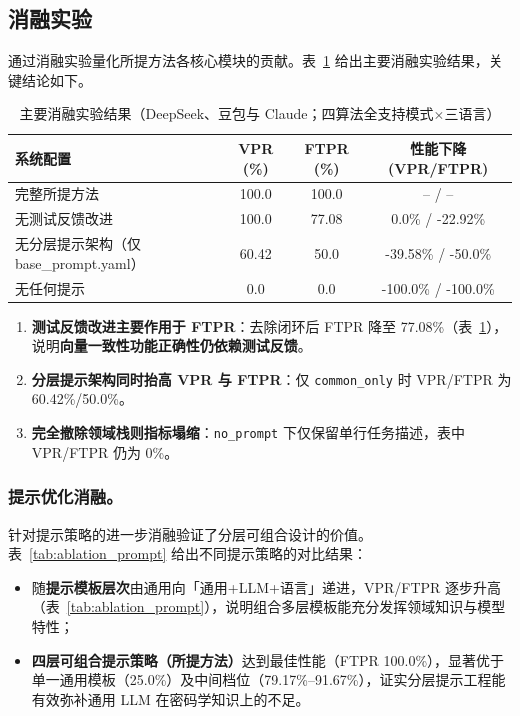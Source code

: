 \documentclass[12pt]{llncs}
\begin{document}
\subsection{消融实验}
通过消融实验量化所提方法各核心模块的贡献。表~\ref{tab:ablation_main} 给出主要消融实验结果，关键结论如下。

\begin{table}[H]
  \centering
  \footnotesize
  \caption{主要消融实验结果（DeepSeek、豆包与 Claude；四算法全支持模式$\times$三语言）}
  \label{tab:ablation_main}
  \setlength{\tabcolsep}{4pt}
  \begin{tabular}{l c c c}
    \toprule
    系统配置                  & VPR (\%) & FTPR (\%) & 性能下降 (VPR/FTPR) \\
    \midrule
    完整所提方法                  & 100.0    & 100.0     & -- / --                     \\
    无测试反馈改进         & 100.0    & 77.08     & 0.0\% / -22.92\%            \\
    无分层提示架构（仅 base_prompt.yaml）  & 60.42    & 50.0      & -39.58\% / -50.0\%          \\
    无任何提示  & 0.0    & 0.0     & -100.0\% / -100.0\%         \\
    \bottomrule
  \end{tabular}
\end{table}

\begin{enumerate}[leftmargin=1.2em, labelsep=0.4em]
  \item \textbf{测试反馈改进主要作用于 FTPR}：去除闭环后 FTPR 降至 77.08\%（表~\ref{tab:ablation_main}），说明\textbf{向量一致性功能正确性仍依赖测试反馈}。
  \item \textbf{分层提示架构同时抬高 VPR 与 FTPR}：仅 \texttt{common\_only} 时 VPR/FTPR 为 60.42\%/50.0\%。
  \item \textbf{完全撤除领域栈则指标塌缩}：\texttt{no\_prompt} 下仅保留单行任务描述，表中 VPR/FTPR 仍为 0\%。
\end{enumerate}


\subsubsection{提示优化消融。}
针对提示策略的进一步消融验证了分层可组合设计的价值。表~\ref{tab:ablation_prompt} 给出不同提示策略的对比结果：
\begin{itemize}[leftmargin=1.2em, labelsep=0.4em]
  \item 随\textbf{提示模板层次}由通用向「通用+LLM+语言」递进，VPR/FTPR 逐步升高（表~\ref{tab:ablation_prompt}），说明组合多层模板能充分发挥领域知识与模型特性；
  \item \textbf{四层可组合提示策略（所提方法）}达到最佳性能（FTPR 100.0\%），显著优于单一通用模板（25.0\%）及中间档位（79.17\%--91.67\%），证实分层提示工程能有效弥补通用 LLM 在密码学知识上的不足。
\end{itemize}
\end{document}
